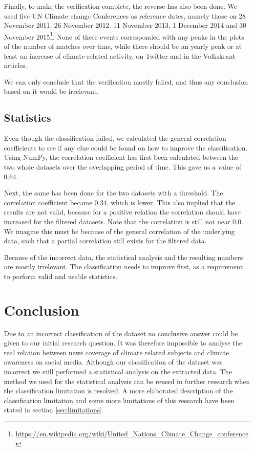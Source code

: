 \documentclass[paper=a4, fontsize=9px]{scrartcl} %
\numberwithin{equation}{section} %
\numberwithin{figure}{section} %
\numberwithin{table}{section} %
\begin{document}
\begin{multicols}{2}
Finally, to make the verification complete, the reverse has also been done. We used five UN Climate change Conferences as reference dates, namely those on 28 November 2011, 26 November 2012, 11 November 2013, 1 December 2014 and 30 November 2015\footnote{\url{https://en.wikipedia.org/wiki/United\_Nations\_Climate\_Change\_conference}}. None of these events corresponded with any peaks in the plots of the number of matches over time, while there should be an yearly peak or at least an increase of climate-related activity, on Twitter and in the Volkskrant articles.

We can only conclude that  the verification mostly failed, and thus any conclusion based on it would be irrelevant.


\subsection{Statistics}

Even though the classification failed, we calculated the general correlation coefficients to see if any clue could be found on how to improve the classification. Using NumPy, the correlation coefficient has first been calculated between the two whole datasets over the overlapping period of time. This gave us a value of 0.64. 

Next, the same has been done for the two datasets with a threshold. The correlation coefficient  became 0.34, which is lower. This also implied that the results are not valid, because for a positive relation the correlation should have increased for the filtered datasets. Note that the correlation is still not near 0.0. We imagine this must be because of the general correlation of the underlying data, such that a partial correlation still exists for the filtered data.

Because of the incorrect data, the statistical analysis and the resulting numbers are mostly irrelevant. The classification needs to improve first, as a requirement to perform valid and usable statistics. 

\section{Conclusion}\label{sec:conclusion}

Due to an incorrect classification of the dataset no conclusive answer could be given to our initial research question. It was therefore impossible to analyse the real relation between news coverage of climate related subjects and climate awareness on social media. Although our classification of the dataset was incorrect we still performed a statistical analysis on the extracted data. The method we used for the statistical analysis can be reused in further research when the classification limitation is resolved.  A more elaborated description of the classification limitation and some more limitations of this research have been stated in section \ref{sec:limitations}. 



\end{multicols}
\end{document}
